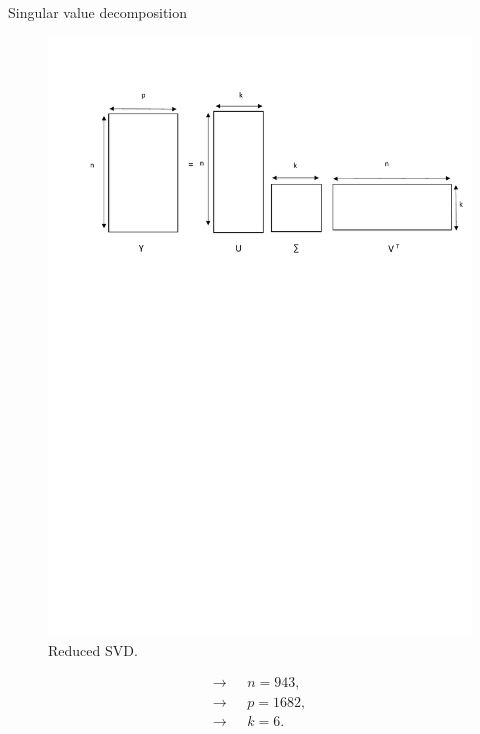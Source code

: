 \documentclass[unknownkeysallowed]{beamer}
\begin{document}
\begin{frame}{Singular value decomposition}
  \begin{figure}[H]
\centering
  \includegraphics[scale=0.4]{./images/svd.pdf}
  \caption{Reduced SVD.}
  \label{fig:svd}
\end{figure} 
\begin{align*}
    \longrightarrow \text{ }& n=943,\\
    \longrightarrow \text{ }& p=1682,\\
    \longrightarrow \text{ }& k=6.
\end{align*}
\end{frame}
\end{document}
